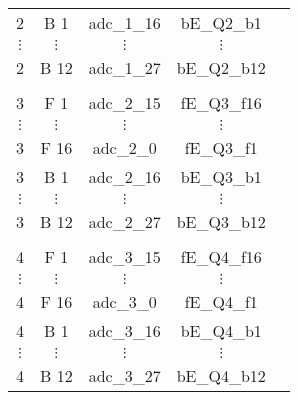 \begin{tabular}{ccccc}
2         & B 1                                                              & adc\_1\_16  & bE\_Q2\_b1  \\
$\vdots$  & $\vdots$                                                         & $\vdots$    & $\vdots$    \\
2         & B 12                                                             & adc\_1\_27  & bE\_Q2\_b12 \\
          &                                                                  &             &             \\
3         & F 1                                                              & adc\_2\_15  & fE\_Q3\_f16 \\
$\vdots$  & $\vdots$                                                         & $\vdots$    & $\vdots$    \\
3         & F 16                                                             & adc\_2\_0   & fE\_Q3\_f1  \\
3         & B 1                                                              & adc\_2\_16  & bE\_Q3\_b1  \\
$\vdots$  & $\vdots$                                                         & $\vdots$    & $\vdots$    \\
3         & B 12                                                             & adc\_2\_27  & bE\_Q3\_b12 \\
          &                                                                  &             &             \\
4         & F 1                                                              & adc\_3\_15  & fE\_Q4\_f16 \\
$\vdots$  & $\vdots$                                                         & $\vdots$    & $\vdots$    \\
4         & F 16                                                             & adc\_3\_0   & fE\_Q4\_f1  \\
4         & B 1                                                              & adc\_3\_16  & bE\_Q4\_b1  \\
$\vdots$  & $\vdots$                                                         & $\vdots$    & $\vdots$    \\
4         & B 12                                                             & adc\_3\_27  & bE\_Q4\_b12 \\
\hline
\end{tabular}
